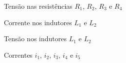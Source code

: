 \documentclass[fleqn, 11pt]{article}
\begin{document}
\begin{figure}[H]
\label{figure:circuito_2}
   \caption{Tensão nas resistências $R_1$, $R_2$, $R_3$ e $R_4$}
\end{figure}

\begin{figure}[H]
\label{figure:circuito_2}
   \caption{Corrente nos indutores $L_1$ e $L_2$}
\end{figure}

\begin{figure}[H]
\label{figure:circuito_2}
   \caption{Tensão nos indutores $L_1$ e $L_2$}
   \end{figure}

\begin{figure}[H]
\label{figure:circuito_2}
   \caption{Correntes $i_1$, $i_2$, $i_3$, $i_4$ e $i_5$}
   \end{figure}
\end{document}
